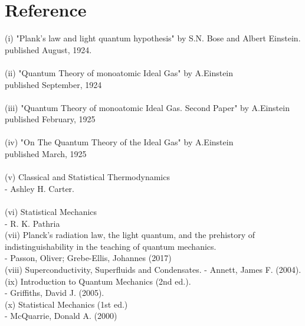 \documentclass[12pt, letterpaper]{article}
\begin{document}
    \newpage
    \section*{Reference}
    (i) "Plank's law and light quantum hypothesis"  by S.N. Bose and Albert Einstein. \\ 
    published August, 1924.\\ 
    \\
    (ii) "Quantum Theory of monoatomic Ideal Gas" by A.Einstein \\
    published September, 1924\\
    \\
    (iii) "Quantum Theory of monoatomic Ideal Gas. Second Paper" by A.Einstein \\
    published February, 1925\\ 
    \\
    (iv) "On The Quantum Theory of the Ideal Gas" by A.Einstein \\
    published March, 1925\\ 
    \\
    (v) Classical and Statistical Thermodynamics \\
     - Ashley H. Carter.\\ 
     \\
    (vi) Statistical Mechanics \\
    - R. K. Pathria\\ 

    (vii) Planck’s radiation law, the light quantum, and the prehistory of indistinguishability 
    in the teaching of quantum mechanics.\\ 
     - Passon, Oliver; Grebe-Ellis, Johannes (2017) \\ 

    (viii) Superconductivity, Superfluids and Condensates. 
     - Annett, James F. (2004).\\

    (ix) Introduction to Quantum Mechanics (2nd ed.). \\
     - Griffiths, David J. (2005).\\

    (x) Statistical Mechanics (1st ed.)\\
     - McQuarrie, Donald A. (2000)\\
\end{document}
